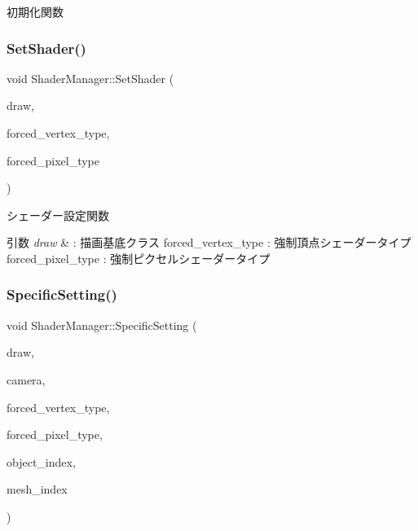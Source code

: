 初期化関数 

\mbox{\label{class_shader_manager_ad2caed4ae50c1ca784151d0f9e50c381}} 
\subsubsection{\texorpdfstring{Set\+Shader()}{SetShader()}}
{\footnotesize\ttfamily void Shader\+Manager\+::\+Set\+Shader (\begin{DoxyParamCaption}\item[{\mbox{\hyperlink{class_draw_base}{Draw\+Base}} $\ast$}]{draw,  }\item[{\mbox{\hyperlink{class_shader_manager_a9b51e49d70eb3cc58f6d1f3994e8cfbd}{Vertex\+Shader\+Type}}}]{forced\+\_\+vertex\+\_\+type,  }\item[{\mbox{\hyperlink{class_shader_manager_a7d15d773b3c6a99dd7086c45c8b0be5f}{Pixel\+Shader\+Type}}}]{forced\+\_\+pixel\+\_\+type }\end{DoxyParamCaption})}



シェーダー設定関数 


\begin{DoxyParams}{引数}
{\em draw} & \+: 描画基底クラス forced\+\_\+vertex\+\_\+type \+: 強制頂点シェーダータイプ forced\+\_\+pixel\+\_\+type \+: 強制ピクセルシェーダータイプ \\
\hline
\end{DoxyParams}
\mbox{\label{class_shader_manager_af016392b9b0477d49165d753e9404ff4}} 
\subsubsection{\texorpdfstring{Specific\+Setting()}{SpecificSetting()}}
{\footnotesize\ttfamily void Shader\+Manager\+::\+Specific\+Setting (\begin{DoxyParamCaption}\item[{\mbox{\hyperlink{class_draw_base}{Draw\+Base}} $\ast$}]{draw,  }\item[{\mbox{\hyperlink{class_camera}{Camera}} $\ast$}]{camera,  }\item[{\mbox{\hyperlink{class_shader_manager_a9b51e49d70eb3cc58f6d1f3994e8cfbd}{Vertex\+Shader\+Type}}}]{forced\+\_\+vertex\+\_\+type,  }\item[{\mbox{\hyperlink{class_shader_manager_a7d15d773b3c6a99dd7086c45c8b0be5f}{Pixel\+Shader\+Type}}}]{forced\+\_\+pixel\+\_\+type,  }\item[{unsigned}]{object\+\_\+index,  }\item[{unsigned}]{mesh\+\_\+index }\end{DoxyParamCaption})}



